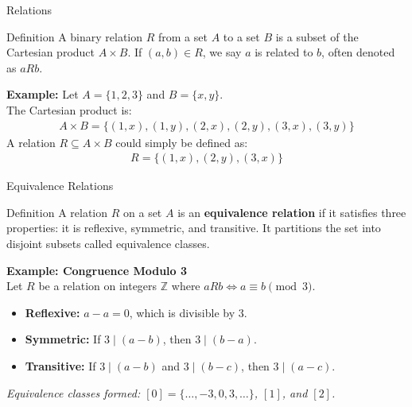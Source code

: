 \documentclass{beamer}
\begin{document}
\begin{frame}{Relations}
\begin{block}{Definition}
A binary relation $R$ from a set $A$ to a set $B$ is a subset of the Cartesian product $A \times B$. If $(a, b) \in R$, we say $a$ is related to $b$, often denoted as $aRb$.
\end{block}
\vspace{0.5cm}
\textbf{Example:} Let $A = \{1, 2, 3\}$ and $B = \{x, y\}$. \\
The Cartesian product is:
\begin{gather*}
A \times B = \{(1, x), (1, y), (2, x), (2, y), (3, x), (3, y)\}
\end{gather*}
A relation $R \subseteq A \times B$ could simply be defined as:
\begin{gather*}
R = \{(1, x), (2, y), (3, x)\}
\end{gather*}
\end{frame}

\begin{frame}{Equivalence Relations}
\begin{block}{Definition}
A relation $R$ on a set $A$ is an \textbf{equivalence relation} if it satisfies three properties: it is reflexive, symmetric, and transitive. It partitions the set into disjoint subsets called equivalence classes.
\end{block}
\vspace{0.3cm}
\textbf{Example: Congruence Modulo 3} \\
Let $R$ be a relation on integers $\mathbb{Z}$ where $aRb \iff a \equiv b \pmod{3}$.
\begin{itemize}
    \item \textbf{Reflexive:} $a - a = 0$, which is divisible by 3.
    \item \textbf{Symmetric:} If $3 \mid (a - b)$, then $3 \mid (b - a)$.
    \item \textbf{Transitive:} If $3 \mid (a - b)$ and $3 \mid (b - c)$, then $3 \mid (a - c)$.
\end{itemize}
\small \textit{Equivalence classes formed: $[0] = \{\dots, -3, 0, 3, \dots\}$, $[1]$, and $[2]$.}
\end{frame}
\end{document}
